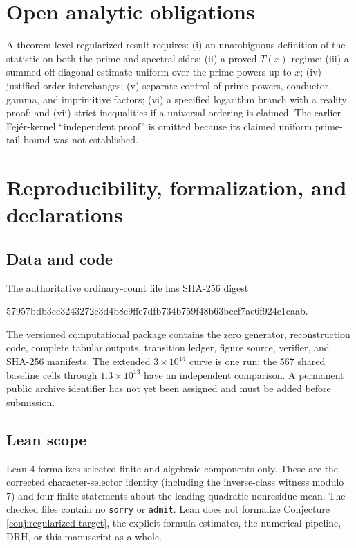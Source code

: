 \documentclass[12pt,reqno]{amsart}
\theoremstyle{definition}
\theoremstyle{remark}
\numberwithin{equation}{section}
\begin{document}
\section{Open analytic obligations}
\label{sec:open-obligations}

A theorem-level regularized result requires: (i) an unambiguous definition of
the statistic on both the prime and spectral sides; (ii) a proved $T(x)$
regime; (iii) a summed off-diagonal estimate uniform over the prime powers up
to $x$; (iv) justified order interchanges; (v) separate control of prime powers,
conductor, gamma, and imprimitive factors; (vi) a specified logarithm branch
with a reality proof; and (vii) strict inequalities if a universal ordering is
claimed.  The earlier Fej\'er-kernel ``independent proof'' is omitted because
its claimed uniform prime-tail bound was not established.

\section{Reproducibility, formalization, and declarations}

\subsection{Data and code}

The authoritative ordinary-count file has SHA-256 digest
\begin{center}
\ttfamily\footnotesize
57957bdb3ce3243272c3d4b8e9ffe7dfb734b759f48b63becf7ae6f924e1caab.
\end{center}
The versioned computational package contains the zero generator,
reconstruction code, complete tabular outputs, transition ledger, figure
source, verifier, and SHA-256 manifests.  The extended $3\times10^{14}$ curve
is one run; the 567 shared baseline cells through $1.3\times10^{13}$ have an
independent comparison.  A permanent public archive identifier has not yet
been assigned and must be added before submission.

\subsection{Lean scope}

Lean 4 formalizes selected finite and algebraic components only.  These are
the corrected character-selector identity (including the inverse-class
witness modulo 7) and four finite statements about the leading
quadratic-nonresidue mean.  The checked files contain no \texttt{sorry} or
\texttt{admit}.  Lean does not formalize Conjecture
\ref{conj:regularized-target}, the explicit-formula estimates, the numerical
pipeline, DRH, or this manuscript as a whole.
\end{document}
